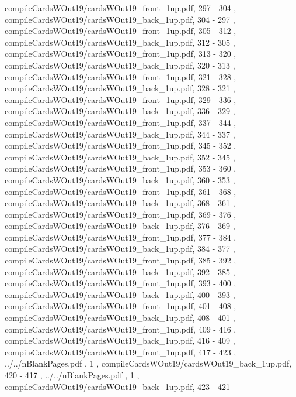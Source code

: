 \documentclass[letterpaper]{article}
\begin{document}
{									compileCardsWOut19/cardsWOut19_front_1up.pdf,		297		-		304		,
									compileCardsWOut19/cardsWOut19_back_1up.pdf,			304		-		297		,
									compileCardsWOut19/cardsWOut19_front_1up.pdf,		305		-		312		,
									compileCardsWOut19/cardsWOut19_back_1up.pdf,			312		-		305		,
									compileCardsWOut19/cardsWOut19_front_1up.pdf,		313		-		320		,
									compileCardsWOut19/cardsWOut19_back_1up.pdf,			320		-		313		,
									compileCardsWOut19/cardsWOut19_front_1up.pdf,		321		-		328		,
									compileCardsWOut19/cardsWOut19_back_1up.pdf,			328		-		321		,
									compileCardsWOut19/cardsWOut19_front_1up.pdf,		329		-		336		,
									compileCardsWOut19/cardsWOut19_back_1up.pdf,			336		-		329		,
									compileCardsWOut19/cardsWOut19_front_1up.pdf,		337		-		344		,
									compileCardsWOut19/cardsWOut19_back_1up.pdf,			344		-		337		,
									compileCardsWOut19/cardsWOut19_front_1up.pdf,		345		-		352		,
									compileCardsWOut19/cardsWOut19_back_1up.pdf,			352		-		345		,
									compileCardsWOut19/cardsWOut19_front_1up.pdf,		353		-		360		,
									compileCardsWOut19/cardsWOut19_back_1up.pdf,			360		-		353		,
									compileCardsWOut19/cardsWOut19_front_1up.pdf,		361		-		368		,
									compileCardsWOut19/cardsWOut19_back_1up.pdf,			368		-		361		,
									compileCardsWOut19/cardsWOut19_front_1up.pdf,		369		-		376		,
									compileCardsWOut19/cardsWOut19_back_1up.pdf,			376		-		369		,
									compileCardsWOut19/cardsWOut19_front_1up.pdf,		377		-		384		,
									compileCardsWOut19/cardsWOut19_back_1up.pdf,			384		-		377		,
									compileCardsWOut19/cardsWOut19_front_1up.pdf,		385		-		392		,
									compileCardsWOut19/cardsWOut19_back_1up.pdf,			392		-		385		,
									compileCardsWOut19/cardsWOut19_front_1up.pdf,		393		-		400		,
									compileCardsWOut19/cardsWOut19_back_1up.pdf,			400		-		393		,
									compileCardsWOut19/cardsWOut19_front_1up.pdf,		401		-		408		,
									compileCardsWOut19/cardsWOut19_back_1up.pdf,			408		-		401		,
									compileCardsWOut19/cardsWOut19_front_1up.pdf,		409		-		416		,
									compileCardsWOut19/cardsWOut19_back_1up.pdf,			416		-		409		,
									compileCardsWOut19/cardsWOut19_front_1up.pdf,		417		-		423		,
									../../nBlankPages.pdf 											,			1							,
									compileCardsWOut19/cardsWOut19_back_1up.pdf,		420		-		417		,
									../../nBlankPages.pdf 											,			1							,
									compileCardsWOut19/cardsWOut19_back_1up.pdf,		423		-		421		
								}
	
\end{document}
